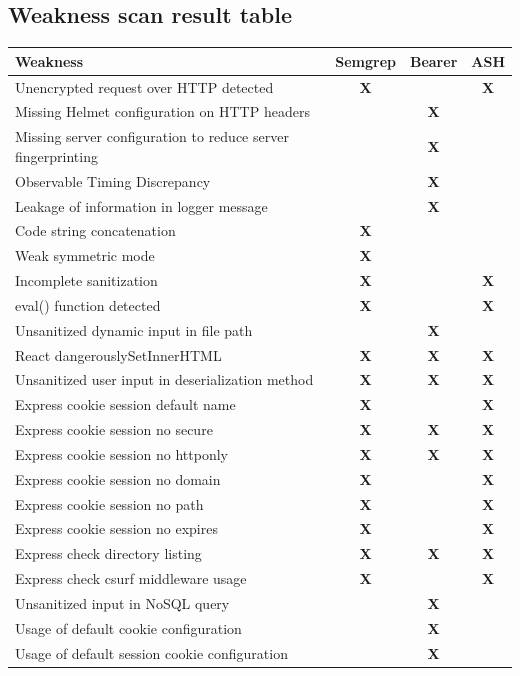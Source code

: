 \documentclass[]{article}
\newcommand{\cmark}{\textbf{X}} %
\begin{document}
\subsection{Weakness scan result table}
\begin{center}
\begin{tabular}{| m{10cm} | c | c | c |}
\hline
\textbf{Weakness} & \textbf{Semgrep} & \textbf{Bearer} & \textbf{ASH} \\ 
\hline
Unencrypted request over HTTP detected & \cmark & & \cmark \\ 
\hline
Missing Helmet configuration on HTTP headers & & \cmark & \\ 
\hline
Missing server configuration to reduce server fingerprinting & & \cmark & \\ 
\hline
Observable Timing Discrepancy & & \cmark & \\ 
\hline
Leakage of information in logger message & & \cmark & \\ 
\hline
Code string concatenation & \cmark & & \\ 
\hline
Weak symmetric mode & \cmark & & \\ 
\hline
Incomplete sanitization & \cmark & & \cmark \\ 
\hline
eval() function detected & \cmark & & \cmark \\ 
\hline
Unsanitized dynamic input in file path & & \cmark & \\ 
\hline
React dangerouslySetInnerHTML & \cmark & \cmark & \cmark \\ 
\hline
Unsanitized user input in deserialization method & \cmark & \cmark & \cmark \\ 
\hline
Express cookie session default name & \cmark & & \cmark \\ 
\hline
Express cookie session no secure & \cmark & \cmark & \cmark \\ 
\hline
Express cookie session no httponly & \cmark & \cmark & \cmark \\ 
\hline
Express cookie session no domain & \cmark & & \cmark \\ 
\hline
Express cookie session no path & \cmark & & \cmark \\ 
\hline
Express cookie session no expires & \cmark & & \cmark \\ 
\hline
Express check directory listing & \cmark & \cmark & \cmark \\ 
\hline
Express check csurf middleware usage & \cmark & & \cmark \\ 
\hline
Unsanitized input in NoSQL query & & \cmark & \\ 
\hline
Usage of default cookie configuration & & \cmark & \\ 
\hline
Usage of default session cookie configuration & & \cmark & \\ 
\hline
\end{tabular}
\end{center}
\end{document}
